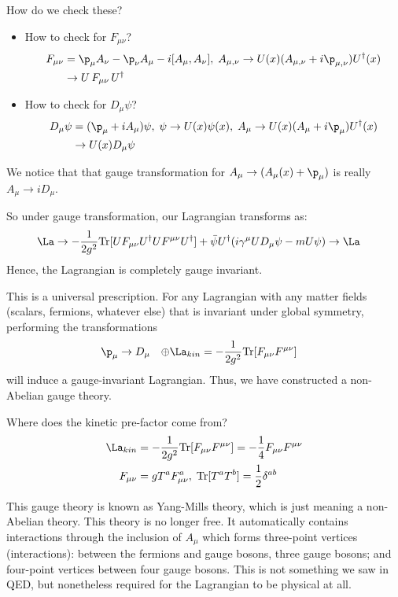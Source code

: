 \documentclass[a4paper, 11pt, normalem]{report}
\begin{document}
How do we check these?
\begin{itemize}
    \item How to check for $F_{\mu\nu}$?
        \begin{align}
            F_{\mu\nu} &= \p_\mu A_\nu - \p_\nu A_\mu - i[A_\mu,A_\nu],\; A_{\mu,\nu} \to U(x)(A_{\mu,\nu} + i\p_{\mu,\nu})U^\dagger(x) \\
                       &\to U\,F_{\mu\nu}\,U^\dagger
        \end{align}
    \item How to check for $D_\mu\psi$?
        \begin{align}
            D_\mu\psi &= (\p_\mu + iA_\mu)\psi,\; \psi \to U(x)\psi(x),\; A_\mu \to U(x)(A_\mu+i\p_\mu)U^\dagger(x) \\
                      &\to U(x)D_\mu\psi
        \end{align}
\end{itemize}
We notice that that gauge transformation for $A_\mu \to (A_\mu(x)+\p_\mu)$ is really $A_\mu \to iD_\mu$.

So under gauge transformation, our Lagrangian transforms as:
\begin{align}
    \La &\to -\frac{1}{2g^2}\text{Tr}[UF_{\mu\nu}U^\dagger UF^{\mu\nu}U^\dagger] + \bar{\psi}U^\dagger(i\gamma^\mu UD_\mu\psi - mU\psi) \to \La
\end{align}
Hence, the Lagrangian is completely gauge invariant.

This is a universal prescription.
For any Lagrangian with any matter fields (scalars, fermions, whatever else) that is invariant under global symmetry, performing the transformations
\begin{align}
    \p_\mu &\to D_\mu & \oplus \La_{kin} &= -\frac{1}{2g^2}\text{Tr}[F_{\mu\nu}F^{\mu\nu}]
\end{align}
will induce a gauge-invariant Lagrangian.
Thus, we have constructed a non-Abelian gauge theory.

Where does the kinetic pre-factor come from?
\begin{align}
    \La_{kin} &= -\frac{1}{2g^2}\text{Tr}[F_{\mu\nu}F^{\mu\nu}] = -\frac14F_{\mu\nu}F^{\mu\nu} \\
    F_{\mu\nu} &= gT^aF_{\mu\nu}^a,\; \text{Tr}[T^aT^b] = \frac12\delta^{ab}
\end{align}

This gauge theory is known as Yang-Mills theory, which is just meaning a non-Abelian theory.
This theory is no longer free.
It automatically contains interactions through the inclusion of $A_\mu$ which forms three-point vertices (interactions): between the fermions and gauge bosons, three gauge bosons; and four-point vertices between four gauge bosons.
This is not something we saw in QED, but nonetheless required for the Lagrangian to be physical at all.
\end{document}
